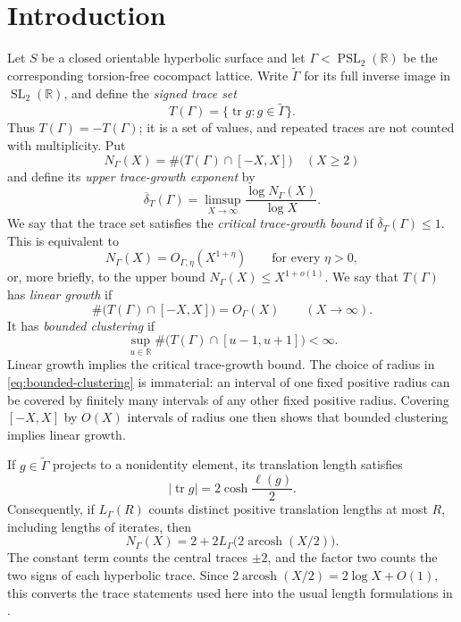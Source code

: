 \documentclass[11pt,reqno]{amsart}
\theoremstyle{definition}
\theoremstyle{remark}
\newcommand{\R}{\mathbb R}
\newcommand{\Tr}{\operatorname{tr}}
\newcommand{\SL}{\operatorname{SL}}
\newcommand{\PSL}{\operatorname{PSL}}
\begin{document}
\maketitle
\enlargethispage{2pt}
\tableofcontents

\section{Introduction}

Let \(S\) be a closed orientable hyperbolic surface and let
\(\Gamma<\PSL_2(\R)\) be the corresponding torsion-free cocompact lattice.
Write \(\widetilde\Gamma\) for its full inverse image in \(\SL_2(\R)\), and
define the \emph{signed trace set}
\[
 T(\Gamma)=\{\Tr g:g\in\widetilde\Gamma\}.
\]
Thus \(T(\Gamma)=-T(\Gamma)\); it is a set of values, and repeated traces are
not counted with multiplicity.  Put
\[
 N_\Gamma(X)=\#\bigl(T(\Gamma)\cap[-X,X]\bigr)
 \quad (X\ge2)
\]
and define its \emph{upper trace-growth exponent} by
\begin{equation}\label{eq:upper-trace-exponent}
 \overline\delta_T(\Gamma)
 =\limsup_{X\to\infty}\frac{\log N_\Gamma(X)}{\log X}.
\end{equation}
We say that the trace set satisfies the \emph{critical trace-growth bound}
if \(\overline\delta_T(\Gamma)\le1\).  This is equivalent to
\begin{equation}\label{eq:critical-trace-growth}
 N_\Gamma(X)=O_{\Gamma,\eta}(X^{1+\eta})
 \qquad\text{for every }\eta>0,
\end{equation}
or, more briefly, to the upper bound \(N_\Gamma(X)\le X^{1+o(1)}\).
We say that \(T(\Gamma)\) has
\emph{linear growth} if
\begin{equation}\label{eq:linear-growth}
 \#\bigl(T(\Gamma)\cap[-X,X]\bigr)=O_\Gamma(X)
 \qquad (X\longrightarrow\infty).
\end{equation}
It has \emph{bounded clustering} if
\begin{equation}\label{eq:bounded-clustering}
 \sup_{u\in\R}\#\bigl(T(\Gamma)\cap[u-1,u+1]\bigr)<\infty.
\end{equation}
Linear growth implies the critical trace-growth bound.  The choice of radius
in \eqref{eq:bounded-clustering} is immaterial: an
interval of one fixed positive radius can be covered by finitely many
intervals of any other fixed positive radius.  Covering \([-X,X]\) by
\(O(X)\) intervals of radius one then shows that bounded clustering implies
linear growth.

If \(g\in\widetilde\Gamma\) projects to a nonidentity element, its translation
length satisfies
\begin{equation}\label{eq:trace-length}
 |\Tr g|=2\cosh\frac{\ell(g)}2.
\end{equation}
Consequently, if \(L_\Gamma(R)\) counts distinct positive translation
lengths at most \(R\), including lengths of iterates, then
\[
 N_\Gamma(X)=2+2L_\Gamma\bigl(2\operatorname{arcosh}(X/2)\bigr).
\]
The constant term counts the central traces \(\pm2\), and the factor two
counts the two signs of each hyperbolic trace.  Since
\(2\operatorname{arcosh}(X/2)=2\log X+O(1)\), this converts the trace statements used here
into the usual length formulations in \cite{Sarnak,Schmutz}.
\end{document}
